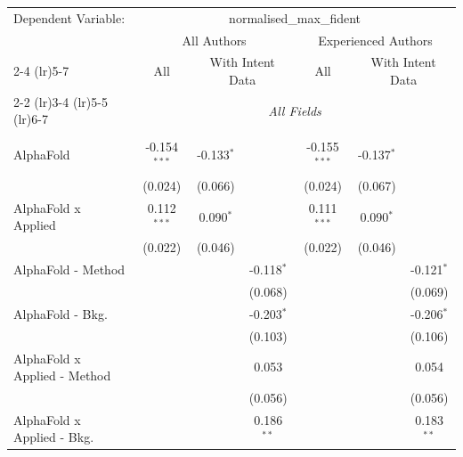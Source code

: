 \begingroup
\centering
\begin{tabular}{lcccccc}
   \tabularnewline \midrule \midrule
   Dependent Variable: & \multicolumn{6}{c}{normalised\_max\_fident}\\
 & \multicolumn{3}{c}{All Authors} & \multicolumn{3}{c}{Experienced Authors} \\
\cmidrule(lr){2-4} \cmidrule(lr){5-7}
 & \multicolumn{1}{c}{All} & \multicolumn{2}{c}{With Intent Data} & \multicolumn{1}{c}{All} & \multicolumn{2}{c}{With Intent Data} \\
\cmidrule(lr){2-2} \cmidrule(lr){3-4} \cmidrule(lr){5-5} \cmidrule(lr){6-7}
 & \multicolumn{6}{c}{\textit{All Fields}} \\ \\
   AlphaFold                      & -0.154$^{***}$ & -0.133$^{*}$ &              & -0.155$^{***}$ & -0.137$^{*}$ &   \\   
                                  & (0.024)        & (0.066)      &              & (0.024)        & (0.067)      &   \\   
   AlphaFold x Applied            & 0.112$^{***}$  & 0.090$^{*}$  &              & 0.111$^{***}$  & 0.090$^{*}$  &   \\   
                                  & (0.022)        & (0.046)      &              & (0.022)        & (0.046)      &   \\   
   AlphaFold - Method             &                &              & -0.118$^{*}$ &                &              & -0.121$^{*}$\\   
                                  &                &              & (0.068)      &                &              & (0.069)\\   
   AlphaFold - Bkg.               &                &              & -0.203$^{*}$ &                &              & -0.206$^{*}$\\   
                                  &                &              & (0.103)      &                &              & (0.106)\\   
   AlphaFold x Applied - Method   &                &              & 0.053        &                &              & 0.054\\   
                                  &                &              & (0.056)      &                &              & (0.056)\\   
   AlphaFold x Applied - Bkg.     &                &              & 0.186$^{**}$ &                &              & 0.183$^{**}$\\   

\end{tabular}
